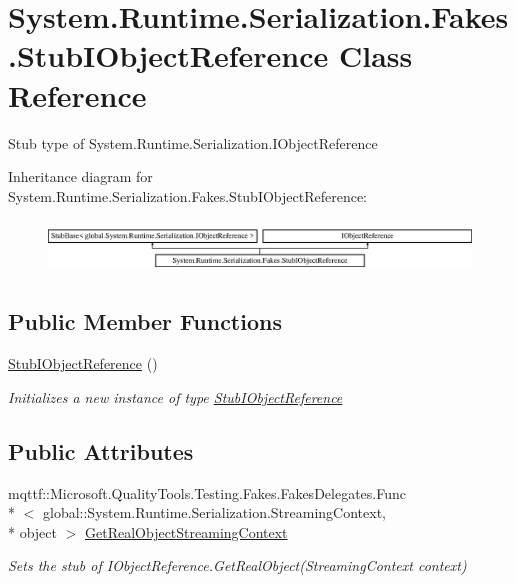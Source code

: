 \hypertarget{class_system_1_1_runtime_1_1_serialization_1_1_fakes_1_1_stub_i_object_reference}{\section{System.\-Runtime.\-Serialization.\-Fakes.\-Stub\-I\-Object\-Reference Class Reference}
\label{class_system_1_1_runtime_1_1_serialization_1_1_fakes_1_1_stub_i_object_reference}
}


Stub type of System.\-Runtime.\-Serialization.\-I\-Object\-Reference 


Inheritance diagram for System.\-Runtime.\-Serialization.\-Fakes.\-Stub\-I\-Object\-Reference\-:\begin{figure}[H]
\begin{center}
\leavevmode
\includegraphics[height=1.403509cm]{class_system_1_1_runtime_1_1_serialization_1_1_fakes_1_1_stub_i_object_reference}
\end{center}
\end{figure}
\subsection*{Public Member Functions}
\begin{DoxyCompactItemize}
\item 
\hyperlink{class_system_1_1_runtime_1_1_serialization_1_1_fakes_1_1_stub_i_object_reference_a1451ecaa7902c02331408684820d3faf}{Stub\-I\-Object\-Reference} ()
\begin{DoxyCompactList}\small\item\em Initializes a new instance of type \hyperlink{class_system_1_1_runtime_1_1_serialization_1_1_fakes_1_1_stub_i_object_reference}{Stub\-I\-Object\-Reference}\end{DoxyCompactList}\end{DoxyCompactItemize}
\subsection*{Public Attributes}
\begin{DoxyCompactItemize}
\item 
mqttf\-::\-Microsoft.\-Quality\-Tools.\-Testing.\-Fakes.\-Fakes\-Delegates.\-Func\\*
$<$ global\-::\-System.\-Runtime.\-Serialization.\-Streaming\-Context, \\*
object $>$ \hyperlink{class_system_1_1_runtime_1_1_serialization_1_1_fakes_1_1_stub_i_object_reference_ad7f88dcf4fede261883c50960d0f3dcd}{Get\-Real\-Object\-Streaming\-Context}
\begin{DoxyCompactList}\small\item\em Sets the stub of I\-Object\-Reference.\-Get\-Real\-Object(\-Streaming\-Context context)\end{DoxyCompactList}\end{DoxyCompactItemize}


